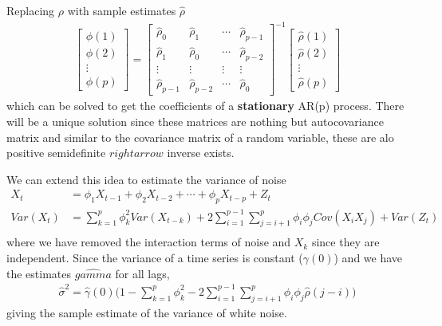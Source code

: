 \documentclass[../../time_series_notes.tex]{subfiles}
\begin{document}
Replacing $\rho$ with sample estimates $\hat{\rho}$
\begin{align*}
    \begin{bmatrix}
        \phi(1)\\
        \phi(2)\\
        \vdots\\
        \phi(p)
    \end{bmatrix}
    =
    \begin{bmatrix}
        \hat{\rho}_{0} &\hat{\rho}_{1} &\cdots &\hat{\rho}_{p-1}\\
        \hat{\rho}_{1} &\hat{\rho}_{0} &\cdots &\hat{\rho}_{p-2}\\
        \vdots &\vdots &\vdots &\vdots\\
        \hat{\rho}_{p-1} &\hat{\rho}_{p-2} &\cdots &\hat{\rho}_{0}
    \end{bmatrix}^{-1}
    \begin{bmatrix}
        \hat{\rho}(1)\\
        \hat{\rho}(2)\\
        \vdots\\
        \hat{\rho}(p)
    \end{bmatrix}
\end{align*}
which can be solved to get the coefficients of a \textbf{stationary} AR(p) process. There will be a unique solution since these matrices are nothing but autocovariance matrix and similar to the covariance matrix of a random variable, these are alo positive semidefinite $rightarrow$ inverse exists.\newline

We can extend this idea to estimate the variance of noise
\begin{align*}
    X_{t} &= \phi_{1}X_{t-1} + \phi_{2}X_{t-2} + \cdots + \phi_{p}X_{t-p} + Z_{t}\\
    Var(X_{t}) &= \sum_{k=1}^{p}\phi_{k}^{2}Var(X_{t-k}) + 2\sum_{i=1}^{p-1}\sum_{j=i+1}^{p} \phi_{i}\phi_{j}Cov(X_{i}X_{j}) + Var(Z_{t})\\
\end{align*}
where we have removed the interaction terms of noise and $X_{k}$ since they are independent. Since the variance of a time series is constant ($\gamma(0)$) and we have the estimates $\hat{gamma}$ for all lags,
\begin{align*}
    \hat{\sigma}^{2} = \hat{\gamma}(0)\bigg(1 - \sum_{k=1}^{p}\phi_{k}^{2} - 2\sum_{i=1}^{p-1}\sum_{j=i+1}^{p} \phi_{i}\phi_{j}\hat{\rho}(j - i)\bigg)
\end{align*}
giving the sample estimate of the variance of white noise.
\end{document}
